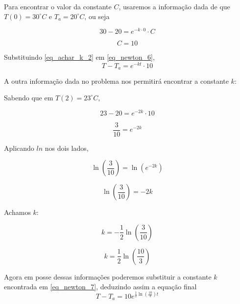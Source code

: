 \documentclass[11pt]{article}
\begin{document}
Para encontrar o valor da constante \(C\), usaremos a informação dada de
que \(T(0) = 30^{\circ}C\) e \(T_{a} = 20^{\circ}C\), ou seja

\begin{equation*}
    \label{eq_achar_k_1}
    30 - 20 = e^{-k \cdot 0} \cdot C
\end{equation*}

\begin{equation}
    \label{eq_achar_k_2}
    C = 10
\end{equation}

Substituindo \eqref{eq_achar_k_2} em \eqref{eq_newton_6},
\begin{equation}
    \label{eq_newton_7}
    T - T_{a} = e^{-kt} \cdot 10
\end{equation}

A outra informação dada no problema nos permitirá encontrar a constante
\(k\):

Sabendo que em \(T(2) = 23^{\circ}C\),

\begin{equation*}
    \label{eq_newton_8}
    23 - 20 = e^{-2k} \cdot 10
\end{equation*}

\begin{equation*}
    \label{eq_newton_9}
    \frac{3}{10} = e^{-2k}
\end{equation*}

Aplicando \(ln\) nos dois lados,

\begin{equation*}
    \label{eq_newton_10}
    \ln(\frac{3}{10}) = \ln(e^{-2k})
\end{equation*}

\begin{equation*}
    \label{eq_newton_11}
    \ln(\frac{3}{10}) = -2k
\end{equation*}

Achamos \(k\):

\begin{equation*}
    k = -\frac{1}{2}\ln(\frac{3}{10})
\end{equation*}

\begin{equation}
    \label{eq_achou_k}
    k = \frac{1}{2}\ln(\frac{10}{3})
\end{equation}

Agora em posse dessas informações poderemos substituir a constante \(k\)
encontrada em \eqref{eq_newton_7}, deduzindo assim a equação final
\begin{equation}
    \label{eq_newton_final}
    T - T_{a} = 10e^{\frac{1}{2}\ln(\frac{10}{3})t}
\end{equation}
\end{document}
